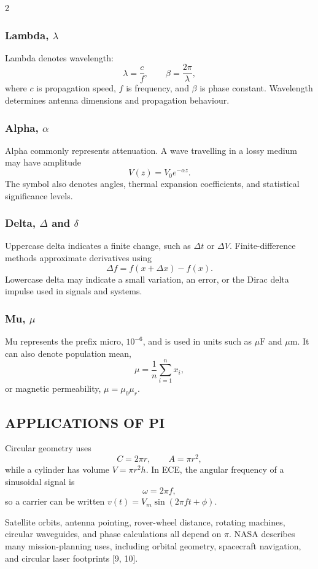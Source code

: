 \begin{multicols}{2}
  \subsubsection*{Lambda, $\lambda$}
  Lambda denotes wavelength:
  \[
    \lambda=\frac{c}{f}, \qquad
    \beta=\frac{2\pi}{\lambda},
  \]
  where $c$ is propagation speed, $f$ is frequency, and $\beta$ is phase constant. Wavelength determines antenna dimensions and propagation behaviour.

  \subsubsection*{Alpha, $\alpha$}
  Alpha commonly represents attenuation. A wave travelling in a lossy medium may have amplitude
  \[
    V(z)=V_0e^{-\alpha z}.
  \]
  The symbol also denotes angles, thermal expansion coefficients, and statistical significance levels.

  \subsubsection*{Delta, $\Delta$ and $\delta$}
  Uppercase delta indicates a finite change, such as $\Delta t$ or $\Delta V$. Finite-difference methods approximate derivatives using
  \[
    \Delta f=f(x+\Delta x)-f(x).
  \]
  Lowercase delta may indicate a small variation, an error, or the Dirac delta impulse used in signals and systems.

  \subsubsection*{Mu, $\mu$}
  Mu represents the prefix micro, $10^{-6}$, and is used in units such as $\mu\mathrm{F}$ and $\mu\mathrm{m}$. It can also denote population mean,
  \[
    \mu=\frac{1}{n}\sum_{i=1}^{n}x_i,
  \]
  or magnetic permeability, $\mu=\mu_0\mu_r$.



  \subsection*{\centering\uppercase{Applications of Pi}}
  Circular geometry uses
  \[
    C=2\pi r, \qquad A=\pi r^2,
  \]
  while a cylinder has volume $V=\pi r^2h$. In ECE, the angular frequency of a sinusoidal signal is
  \[
    \omega=2\pi f,
  \]
  so a carrier can be written $v(t)=V_m\sin(2\pi ft+\phi)$.

  \noindent
  Satellite orbits, antenna pointing, rover-wheel distance, rotating machines, circular waveguides, and phase calculations all depend on $\pi$. NASA describes many mission-planning uses, including orbital geometry, spacecraft navigation, and circular laser footprints [9, 10].


\end{multicols}
